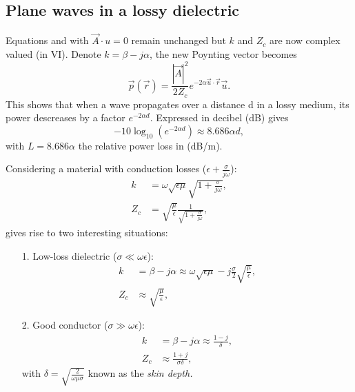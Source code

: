\documentclass[a4paper, 10pt]{article}
\begin{document}
    \subsection*{Plane waves in a lossy dielectric}
    Equations  and  with $\vec{A}\cdot u=0$ remain unchanged but $k$ and $Z_c$ are now complex valued (in VI). 
    Denote $k=\beta-j\alpha$, the new Poynting vector becomes 
    \begin{equation}\vec{p}(\vec{r})=\frac{|\vec{A}|^2}{2Z_c}e^{-2\alpha\vec{u}\cdot\vec{r}}\vec{u}.\label{PW_eq4}\end{equation}
    This shows that when a wave propagates over a distance d in a lossy medium, its power descreases by a factor $e^{-2\alpha d}$. Expressed in decibel (dB) gives
    \begin{equation}-10\log_{10}(e^{-2\alpha d})\approx 8.686\alpha d,\label{PW_eq5}\end{equation} with $L=8.686\alpha$ the relative power loss in (dB/m).

    Considering a material with conduction losses ($\epsilon + \frac{\sigma}{j\omega}$):
    \begin{align}
        k & = \omega\sqrt{\epsilon\mu}\sqrt{1+\frac{\sigma}{j\omega}}\label{PW_eq6},\\
        Z_c & = \sqrt{\frac{\mu}{\epsilon}}\frac{1}{\sqrt{1+\frac{\sigma}{j\omega}}}\label{PW_eq7},
    \end{align}
    gives rise to two interesting situations:
    \begin{itemize}
        \item[1.] Low-loss dielectric ($\sigma \ll \omega\epsilon$):
        \begin{align}
            k & = \beta - j\alpha \approx \omega\sqrt{\epsilon\mu} - j\frac{\sigma}{2}\sqrt{\frac{\mu}{\epsilon}} \label{PW_eq8},\\
            Z_c & \approx \sqrt{\frac{\mu}{\epsilon}} \label{PW_eq9},
        \end{align}
        \item[2.] Good conductor ($\sigma \gg \omega\epsilon$):
        \begin{align}
            k & = \beta - j\alpha \approx \frac{1-j}{\delta} \label{PW_eq10},\\
            Z_c & \approx \frac{1+j}{\sigma\delta} \label{PW_eq11},
        \end{align}
        with $\delta = \sqrt{\frac{2}{\omega\mu\sigma}}$ known as the \it{skin depth}.
    \end{itemize}


 
\end{document}
